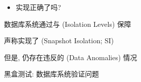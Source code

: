 
\begin{frame}{}
  \begin{itemize}
    \centering
    \item {}实现正确了吗?
  \end{itemize}

  \begin{center}
  \end{center}

	\begin{center}
		数据库系统通过与 (Isolation Levels) 保障
	\end{center}
\end{frame}

\begin{frame}{}
	\begin{center}
		声称实现了 (Snapshot Isolation; SI)

	\end{center}
\end{frame}

\begin{frame}{}
	\begin{center}
		但是, 仍存在违反的 (Data Anomalies) 情况

	\end{center}
\end{frame}

\begin{frame}{}
	\begin{center}
		{\Large 黑盒测试: 数据库系统验证问题}

	\end{center}
\end{frame}

\begin{frame}{}
	\begin{center}

		\vspace{5pt}

	\end{center}
\end{frame}


